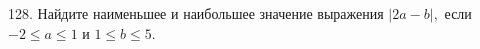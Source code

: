 128. Найдите наименьшее и наибольшее значение выражения $|2a-b|,$ если $-2\leqslant a \leqslant 1$ и $1\leqslant b \leqslant 5.$\\
